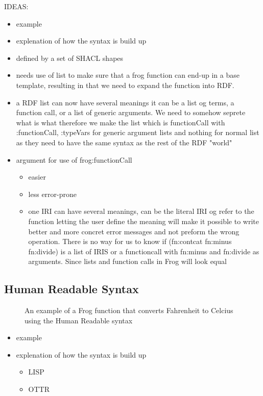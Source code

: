 \para 
IDEAS:
\begin{itemize}
    \item example 
    \item explenation of how the syntax is build up
    \item defined by a set of SHACL shapes 
    \item needs use of list to make sure that a frog function can end-up in a base template, resulting in that we need to expand the function into RDF. 
    \item a RDF list can now have several meanings it can be a list og terms, a function call, or a list of generic arguments. We need to somehow seprete what is what therefore we make the list which is functionCall with :functionCall, :typeVars for generic argument lists and nothing for normal list as they need to have the same syntax as the rest of the RDF "world"
    \item argument for use of frog:functionCall
    \begin{itemize}
        \item easier 
        \item less error-prone
        \item one IRI can have several meanings, can be the literal IRI og refer to the function letting the user define the meaning will make it possible to write better and more concret error messages and not preform the wrong operation. There is no way for us to know if (fn:contcat fn:minus fn:divide) is a list of IRIS or a functioncall with fn:minus and fn:divide as arguments. Since lists and function calls in Frog will look equal 
    \end{itemize}
\end{itemize}

\subsection{Human Readable Syntax}

\begin{figure}[h]
    
    \caption{An example of a Frog function that converts Fahrenheit to Celcius using the Human Readable syntax}
    \label{fig:hrs_example}
\end{figure}

\begin{itemize}
    \item example 
    \item explenation of how the syntax is build up
    \begin{itemize}
        \item LISP 
        \item OTTR 
    \end{itemize}
\end{itemize}

